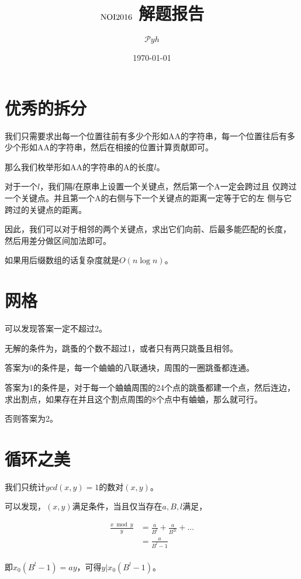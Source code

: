 \documentclass[a4paper]{article}
\date{\today}
\title{$\rm NOI2016$ 解题报告}
\author{$\mathcal Pyh$}
\newcommand{\kai}{\CJKfamily{kai}}
\begin{document}
\maketitle

\kai

\section{优秀的拆分}

我们只需要求出每一个位置往前有多少个形如AA的字符串，每一个位置往后有多
少个形如AA的字符串，然后在相接的位置计算贡献即可。

那么我们枚举形如AA的字符串的A的长度$l$。

对于一个$l$，我们隔$l$在原串上设置一个关键点，然后第一个A一定会跨过且
仅跨过一个关键点。并且第一个A的右侧与下一个关键点的距离一定等于它的左
侧与它跨过的关键点的距离。

因此，我们可以对于相邻的两个关键点，求出它们向前、后最多能匹配的长度，
然后用差分做区间加法即可。

如果用后缀数组的话复杂度就是$O(n\log n)$。

\section{网格}

可以发现答案一定不超过2。

无解的条件为，跳蚤的个数不超过1，或者只有两只跳蚤且相邻。

答案为0的条件是，每一个蛐蛐的八联通块，周围的一圈跳蚤都连通。

答案为1的条件是，对于每一个蛐蛐周围的24个点的跳蚤都建一个点，然后连边，
求出割点，如果存在并且这个割点周围的8个点中有蛐蛐，那么就可行。

否则答案为2。

\section{循环之美}

我们只统计$gcd(x,y)=1$的数对$(x,y)$。

可以发现，$(x,y)$满足条件，当且仅当存在$a,B,l$满足，

\begin{align*}
  \frac{x\bmod y}{y}&=\frac{a}{B^l}+\frac{a}{B^{2l}}+...\\
                    &=\frac{a}{B^l-1}\\
\end{align*}

即$x_0(B^l-1)=ay$，可得$y|x_0(B^l-1)$。
\end{document}
